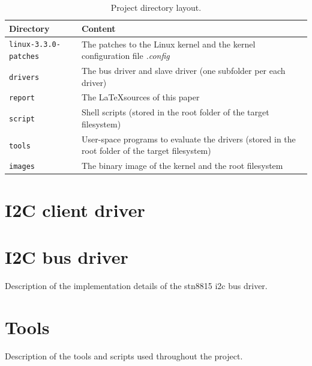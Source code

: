 \documentclass[a4paper,10pt]{article}
\begin{document}
\begin{multicols}{2}
\begin{table}
	\centering
	\renewcommand{\arraystretch}{1.2}	
	\begin{tabular}{p{5cm} p{11cm}}
		\hline
		Directory & Content \\
		\hline
		\texttt{linux-3.3.0-patches} & The patches to the Linux kernel and the 
			kernel configuration file \emph{.config}\\
		\texttt{drivers} & The bus driver and slave driver (one subfolder per
			each driver) \\
		\texttt{report} & The \LaTeX sources of this paper \\
		\texttt{script} & Shell scripts (stored in the root folder of the target
			filesystem) \\
		\texttt{tools} & User-space programs to evaluate the drivers (stored in
			the root folder of the target filesystem) \\
		\texttt{images} & The binary image of the kernel and the root
			filesystem \\
		\hline
	\end{tabular}
	\caption{Project directory layout.}
	\label{table:project-dir-layout}
\end{table}




\section{I2C client driver}
\label{sec:i2c_client_driver}



\section{I2C bus driver}
\label{sec:i2c_bus_driver}

Description of the implementation details of the stn8815 i2c bus driver.



\section{Tools}
\label{sec:tools}

Description of the tools and scripts used throughout the project.




\end{multicols}
\end{document}
